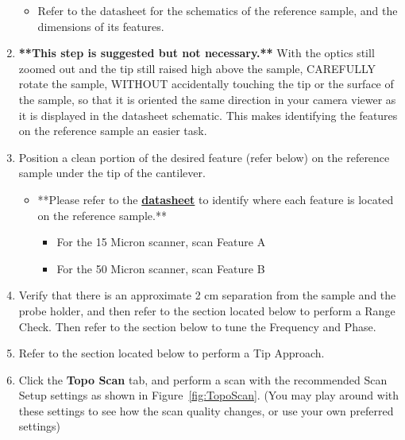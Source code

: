 \documentclass{../lab}
\begin{document}
\begin{enumerate}
    \begin{itemize}
        \item Refer to the datasheet for the schematics of the reference sample, and the dimensions of its features.
    \end{itemize}

    \item \textbf{**This step is suggested but not necessary.**  }With the optics still zoomed out and the tip still raised high above the sample, CAREFULLY rotate the sample, WITHOUT accidentally touching the tip or the surface of the sample, so that it is oriented the same direction in your camera viewer as it is displayed in the datasheet schematic.  This makes identifying the features on the reference sample an easier task.

    \item Position a clean portion of the desired feature (refer below) on the reference sample under the tip of the cantilever.

    \begin{itemize}
        \item **Please refer to the \href{http://experimentationlab.berkeley.edu/sites/default/files/AFMImages/Reference-\%20sample-SHS-01\_3\_datasheet.pdf}{\textbf{datasheet}} to identify where each feature is located on the reference sample.**

        \begin{itemize}
            \item For the 15 Micron scanner, scan Feature A

            \item For the 50 Micron scanner, scan Feature B
        \end{itemize}

    \end{itemize}

    \item Verify that there is an approximate 2 cm separation from the sample and the probe holder, and then refer to the \textbf{} section located below to perform a Range Check. Then refer to the  section below to tune the Frequency and Phase.

    \item Refer to the  section located below to perform a Tip Approach.

    \item Click the \textbf{Topo Scan }tab, and perform a scan with the recommended Scan Setup settings as shown in Figure~\ref{fig:TopoScan}. (You may play around with these settings to see how the scan quality changes, or use your own preferred settings)


\end{enumerate}
\end{document}
